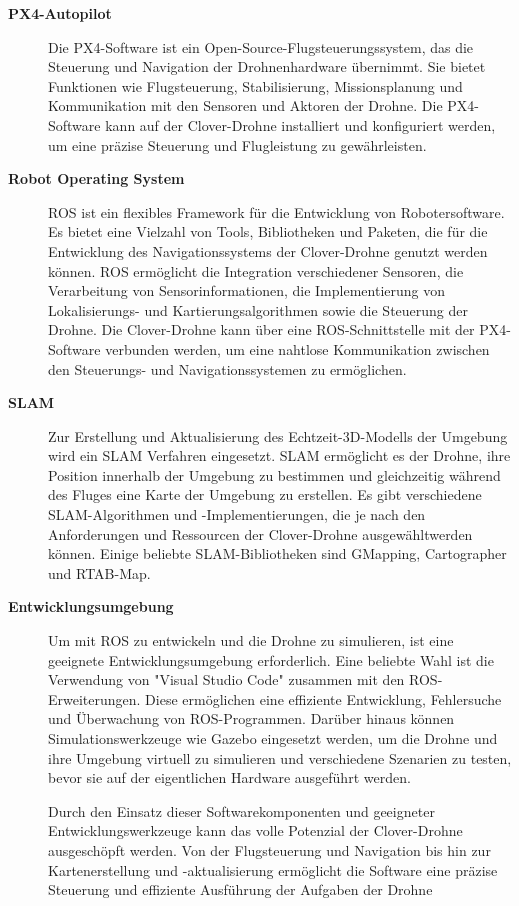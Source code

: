\begin{description}
    \item[\textbf{PX4-Autopilot}] Die PX4-Software ist ein Open-Source-Flugsteuerungssystem, das die Steuerung und Navigation der Drohnenhardware übernimmt. Sie bietet Funktionen wie Flugsteuerung, Stabilisierung, Missionsplanung und Kommunikation mit den Sensoren und Aktoren der Drohne. Die PX4-Software kann auf der Clover-Drohne installiert und konfiguriert werden, um eine präzise Steuerung und Flugleistung zu gewährleisten.
    
    \item[\textbf{Robot Operating System}]ROS ist ein flexibles Framework für die Entwicklung von Robotersoftware. Es bietet eine Vielzahl von Tools, Bibliotheken und Paketen, die für die Entwicklung des Navigationssystems der Clover-Drohne genutzt werden können. ROS ermöglicht die Integration verschiedener Sensoren, die Verarbeitung von Sensorinformationen, die Implementierung von Lokalisierungs- und Kartierungsalgorithmen sowie die Steuerung der Drohne. Die Clover-Drohne kann über eine ROS-Schnittstelle mit der PX4-Software verbunden werden, um eine nahtlose Kommunikation zwischen den Steuerungs- und Navigationssystemen zu ermöglichen.
    \item[\textbf{\ac{SLAM}}] Zur Erstellung und Aktualisierung des Echtzeit-3D-Modells der Umgebung wird ein \ac{SLAM} Verfahren eingesetzt. \ac{SLAM} ermöglicht es der Drohne, ihre Position innerhalb der Umgebung zu bestimmen und gleichzeitig während des Fluges eine Karte der Umgebung zu erstellen. Es gibt verschiedene SLAM-Algorithmen und -Implementierungen, die je nach den Anforderungen und Ressourcen der Clover-Drohne ausgewähltwerden können. Einige beliebte SLAM-Bibliotheken sind GMapping, Cartographer und RTAB-Map.
    
    \item[\textbf{Entwicklungsumgebung}]  Um mit ROS zu entwickeln und die Drohne zu simulieren, ist eine geeignete Entwicklungsumgebung erforderlich. Eine beliebte Wahl ist die Verwendung von "Visual Studio Code" zusammen mit den ROS-Erweiterungen. Diese ermöglichen eine effiziente Entwicklung, Fehlersuche und Überwachung von ROS-Programmen. Darüber hinaus können Simulationswerkzeuge wie Gazebo eingesetzt werden, um die Drohne und ihre Umgebung virtuell zu simulieren und verschiedene Szenarien zu testen, bevor sie auf der eigentlichen Hardware ausgeführt werden.

    Durch den Einsatz dieser Softwarekomponenten und geeigneter Entwicklungswerkzeuge kann das volle Potenzial der Clover-Drohne ausgeschöpft werden. Von der Flugsteuerung und Navigation bis hin zur Kartenerstellung und -aktualisierung ermöglicht die Software eine präzise Steuerung und effiziente Ausführung der Aufgaben der Drohne
     
\end{description}

